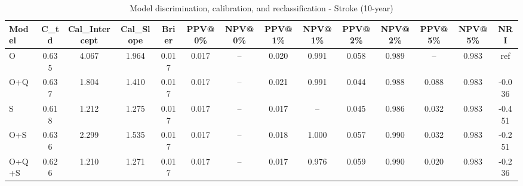 \begin{table}[htbp]
\centering
\small
\caption{Model discrimination, calibration, and reclassification - Stroke (10-year)}
\label{tab:perf_stroke_10y}
\begin{tabular}{lccccccccccccc}
\toprule
Model & C\_td & Cal\_Intercept & Cal\_Slope & Brier & PPV@0\% & NPV@0\% & PPV@1\% & NPV@1\% & PPV@2\% & NPV@2\% & PPV@5\% & NPV@5\% & NRI \\
\midrule
O & 0.635 & 4.067 & 1.964 & 0.017 & 0.017 & -- & 0.020 & 0.991 & 0.058 & 0.989 & -- & 0.983 & ref \\
O+Q & 0.637 & 1.804 & 1.410 & 0.017 & 0.017 & -- & 0.021 & 0.991 & 0.044 & 0.988 & 0.088 & 0.983 & -0.036 \\
S & 0.618 & 1.212 & 1.275 & 0.017 & 0.017 & -- & 0.017 & -- & 0.045 & 0.986 & 0.032 & 0.983 & -0.451 \\
O+S & 0.636 & 2.299 & 1.535 & 0.017 & 0.017 & -- & 0.018 & 1.000 & 0.057 & 0.990 & 0.032 & 0.983 & -0.251 \\
O+Q+S & 0.626 & 1.210 & 1.271 & 0.017 & 0.017 & -- & 0.017 & 0.976 & 0.059 & 0.990 & 0.020 & 0.983 & -0.236 \\
\bottomrule
\end{tabular}
\end{table}